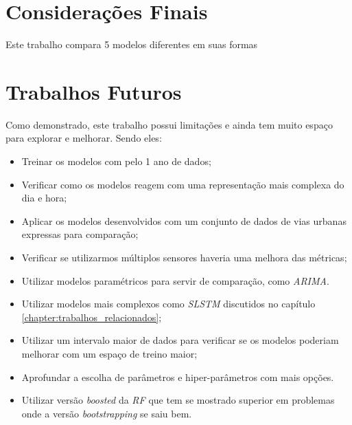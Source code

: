 
\section{Considerações Finais}

Este trabalho compara 5 modelos diferentes em suas formas 

\section{Trabalhos Futuros}

Como demonstrado, este trabalho possui limitações e ainda tem muito espaço para explorar e melhorar. Sendo eles:

\begin{itemize}
    \item Treinar os modelos com pelo 1 ano de dados;
    \item Verificar como os modelos reagem com uma representação mais complexa do dia e hora;
    \item Aplicar os modelos desenvolvidos com um conjunto de dados de vias urbanas expressas para comparação;
    \item Verificar se utilizarmos múltiplos sensores haveria uma melhora das métricas;
    \item Utilizar modelos paramétricos para servir de comparação, como \textit{\acrshort{ARIMA}}.
    \item Utilizar modelos mais complexos como \textit{\acrshort{SLSTM}} discutidos no capítulo \ref{chapter:trabalhos_relacionados};
    \item Utilizar um intervalo maior de dados para verificar se os modelos poderiam melhorar com um espaço de treino maior;
    \item Aprofundar a escolha de parâmetros e hiper-parâmetros com mais opções.
    \item Utilizar versão \textit{boosted} da \textit{\acrshort{RF}} que tem se mostrado superior em problemas onde a versão \textit{bootstrapping} se saiu bem.
\end{itemize}